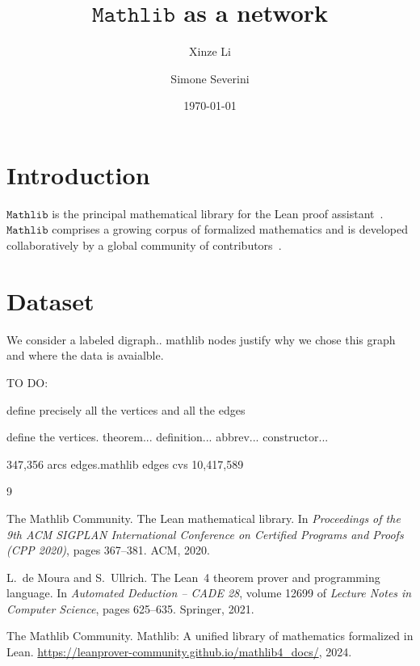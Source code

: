 \documentclass[11pt]{article}
\title{$\mathtt{Mathlib}$ as a network}
\author{Xinze Li \and Simone Severini}
\date{\today}
\begin{document}
\maketitle

\section{Introduction}

$\mathtt{Mathlib}$ is the principal mathematical library for the Lean  proof assistant~\cite{mathlib2020,lean4}. $\mathtt{Mathlib}$ comprises a growing corpus of formalized mathematics and is developed collaboratively by a global community of contributors~\cite{mathlib_community}. 

\section{Dataset}


We consider a labeled digraph.. mathlib nodes justify why we chose this graph and where the data is avaialble. 


TO DO: 

define precisely all the vertices and all the edges

define the vertices. 
theorem...
definition...
abbrev...
constructor...

347,356 arcs
edges.mathlib edges cvs 
10,417,589 


\begin{thebibliography}{9}

The Mathlib Community.
\newblock The {L}ean mathematical library.
\newblock In \emph{Proceedings of the 9th ACM SIGPLAN International Conference on Certified Programs and Proofs (CPP 2020)}, pages 367--381. ACM, 2020.

L.~de Moura and S.~Ullrich.
\newblock The {L}ean~4 theorem prover and programming language.
\newblock In \emph{Automated Deduction -- CADE 28}, volume 12699 of \emph{Lecture Notes in Computer Science}, pages 625--635. Springer, 2021.

The Mathlib Community.
\newblock Mathlib: A unified library of mathematics formalized in {L}ean.
\newblock \url{https://leanprover-community.github.io/mathlib4_docs/}, 2024.

\end{thebibliography}
\end{document}
